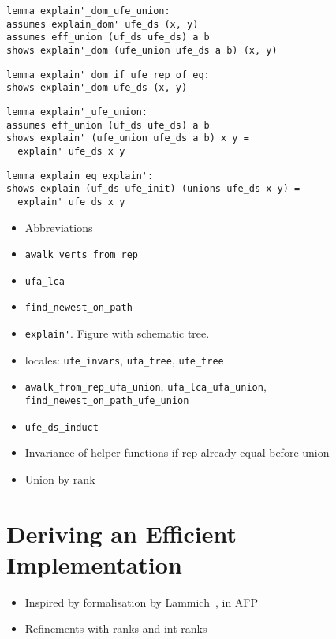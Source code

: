\documentclass[
  sigplan,
  10pt,
  anonymous,
  review,
  ]{acmart}
\begin{document}
\begin{lstlisting}
lemma explain'_dom_ufe_union:
assumes explain_dom' ufe_ds (x, y)
assumes eff_union (uf_ds ufe_ds) a b
shows explain'_dom (ufe_union ufe_ds a b) (x, y)
\end{lstlisting}

\begin{lstlisting}
lemma explain'_dom_if_ufe_rep_of_eq:
shows explain'_dom ufe_ds (x, y)
\end{lstlisting}

\begin{lstlisting}
lemma explain'_ufe_union:
assumes eff_union (uf_ds ufe_ds) a b
shows explain' (ufe_union ufe_ds a b) x y =
  explain' ufe_ds x y
\end{lstlisting}

\begin{lstlisting}
lemma explain_eq_explain':
shows explain (uf_ds ufe_init) (unions ufe_ds x y) =
  explain' ufe_ds x y
\end{lstlisting}
  
\begin{itemize}
  \item Abbreviations
  \item \lstinline|awalk_verts_from_rep|
  \item \lstinline|ufa_lca|
  \item \lstinline|find_newest_on_path|
  \item \lstinline|explain'|. Figure with schematic tree.
  \item locales: \lstinline|ufe_invars|, \lstinline|ufa_tree|, \lstinline|ufe_tree|
  \item \lstinline|awalk_from_rep_ufa_union|, \lstinline|ufa_lca_ufa_union|, \lstinline|find_newest_on_path_ufe_union|
  \item \lstinline|ufe_ds_induct|
  \item Invariance of helper functions if rep already equal before union
  \item Union by rank
\end{itemize}

\section{Deriving an Efficient Implementation}

\begin{itemize}
  \item Inspired by formalisation by Lammich~\cite{unionfind_isabelle}, in AFP~\cite{union_find_afp}
  \item Refinements with ranks and int ranks
\end{itemize}
\end{document}
